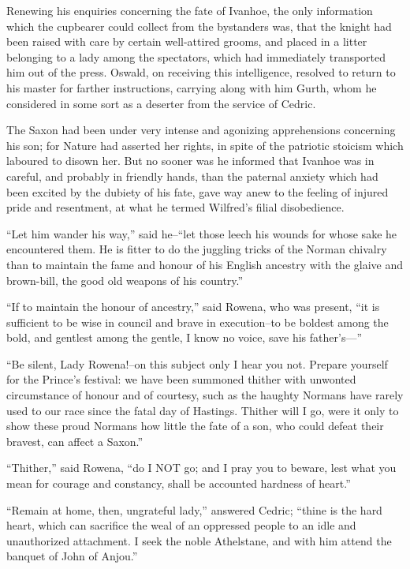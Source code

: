 Renewing his enquiries concerning the fate of Ivanhoe, the only
information which the cupbearer could collect from the bystanders was,
that the knight had been raised with care by certain well-attired
grooms, and placed in a litter belonging to a lady among the spectators,
which had immediately transported him out of the press. Oswald, on
receiving this intelligence, resolved to return to his master for
farther instructions, carrying along with him Gurth, whom he considered
in some sort as a deserter from the service of Cedric.

The Saxon had been under very intense and agonizing apprehensions
concerning his son; for Nature had asserted her rights, in spite of the
patriotic stoicism which laboured to disown her. But no sooner was he
informed that Ivanhoe was in careful, and probably in friendly hands,
than the paternal anxiety which had been excited by the dubiety of his
fate, gave way anew to the feeling of injured pride and resentment, at
what he termed Wilfred's filial disobedience.

``Let him wander his way,'' said he--``let those leech his wounds for
whose sake he encountered them. He is fitter to do the juggling tricks
of the Norman chivalry than to maintain the fame and honour of his
English ancestry with the glaive and brown-bill, the good old weapons of
his country.''

``If to maintain the honour of ancestry,'' said Rowena, who was present,
``it is sufficient to be wise in council and brave in execution--to be
boldest among the bold, and gentlest among the gentle, I know no voice,
save his father's---''

``Be silent, Lady Rowena!--on this subject only I hear you not. Prepare
yourself for the Prince's festival: we have been summoned thither with
unwonted circumstance of honour and of courtesy, such as the haughty
Normans have rarely used to our race since the fatal day of Hastings.
Thither will I go, were it only to show these proud Normans how little
the fate of a son, who could defeat their bravest, can affect a Saxon.''

``Thither,'' said Rowena, ``do I NOT go; and I pray you to beware, lest
what you mean for courage and constancy, shall be accounted hardness of
heart.''

``Remain at home, then, ungrateful lady,'' answered Cedric; ``thine is
the hard heart, which can sacrifice the weal of an oppressed people to
an idle and unauthorized attachment. I seek the noble Athelstane, and
with him attend the banquet of John of Anjou.''

